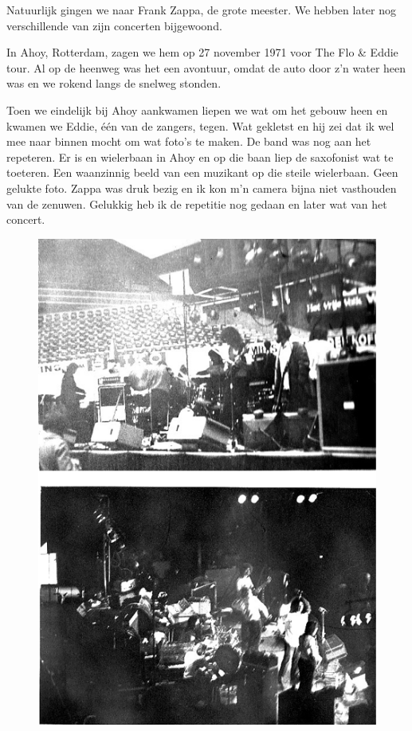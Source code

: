 \documentclass[12pt,twoside, openright]{memoir}
\begin{document}
Natuurlijk gingen we naar Frank Zappa, de grote meester. We hebben later nog verschillende van zijn concerten bijgewoond.

In Ahoy, Rotterdam, zagen we hem op 27 november 1971 voor The Flo & Eddie tour. Al op de heenweg was het een avontuur, omdat de auto door z’n water heen was en we rokend langs de snelweg stonden. 

Toen we eindelijk bij Ahoy aankwamen liepen we wat om het gebouw heen en kwamen we Eddie, één van de zangers, tegen. Wat gekletst en hij zei dat ik wel mee naar binnen mocht om wat foto's te maken. De band was nog aan het repeteren. Er is en wielerbaan in Ahoy en op die baan liep de saxofonist wat te toeteren. Een waanzinnig beeld van een muzikant op die steile wielerbaan. Geen gelukte foto. Zappa was druk bezig en ik kon m’n camera bijna niet vasthouden van de zenuwen. Gelukkig heb ik de repetitie nog gedaan en later wat van het concert.

\begin{figure}
\includegraphics[width=\textwidth]{img/ch31/zappa}
\end{figure} 
\end{document}
